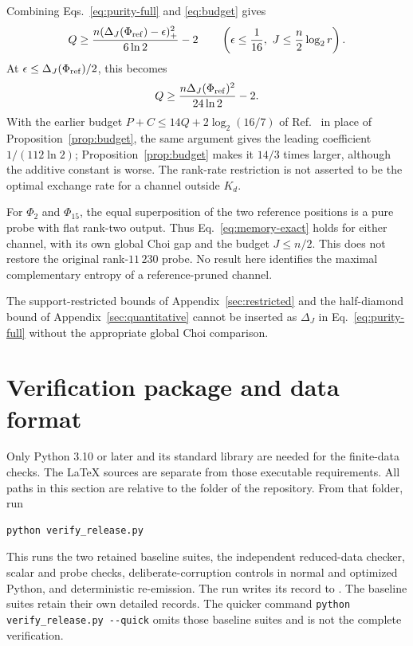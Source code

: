 Combining Eqs.~\eqref{eq:purity-full} and \eqref{eq:budget} gives
\begin{equation}
 Q\ge\frac{n(\Delta_J(\Phi_{\mathrm{ref}})-\epsilon)_+^2}{6\ln2}-2
 \qquad\left(\epsilon\le\frac1{16},\ J\le\frac n2\log_2r\right).
 \label{eq:memory-exact}
\end{equation}
At $\epsilon\le\Delta_J(\Phi_{\mathrm{ref}})/2$, this becomes
\begin{equation}
 Q\ge\frac{n\Delta_J(\Phi_{\mathrm{ref}})^2}{24\ln2}-2.
\end{equation}
With the earlier budget $P+C\le14Q+2\log_2(16/7)$ of Ref.~\cite[Theorem~5.8]{causal} in place
of Proposition~\ref{prop:budget}, the same argument gives the leading coefficient
$1/(112\ln2)$; Proposition~\ref{prop:budget} makes it $14/3$ times larger, although the
additive constant is worse. The rank-rate restriction is not asserted to be the optimal
exchange rate for a channel outside $K_d$.

For $\Phi_2$ and $\Phi_{15}$, the equal superposition of the two reference positions is
a pure probe with flat rank-two output. Thus Eq.~\eqref{eq:memory-exact} holds for either
channel, with its own global Choi gap and the budget $J\le n/2$. This does not restore the
original rank-$11\,230$ probe. No result here identifies the maximal complementary entropy
of a reference-pruned channel.

The support-restricted bounds of Appendix~\ref{sec:restricted} and the half-diamond bound of
Appendix~\ref{sec:quantitative} cannot be inserted as $\Delta_J$ in
Eq.~\eqref{eq:purity-full} without the appropriate global Choi comparison.

\section{Verification package and data format}\label{sec:files}

Only Python 3.10 or later and its standard library are needed for the finite-data checks.
The LaTeX sources are separate from those executable requirements. All paths in this
section are relative to the  folder of the repository. From that folder,
run
\begin{lstlisting}
python verify_release.py
\end{lstlisting}
This runs the two retained baseline suites, the independent reduced-data checker, scalar
and probe checks, deliberate-corruption controls in normal and optimized Python, and
deterministic re-emission. The run writes its record to
. The baseline suites retain their own detailed records.
The quicker command \texttt{python verify\_release.py -{}-quick} omits those baseline suites
and is not the complete verification.

